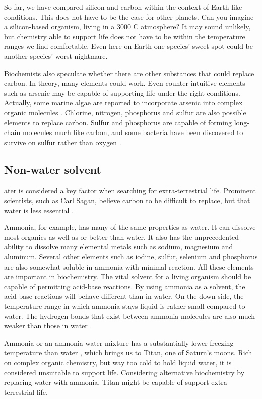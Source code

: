 So far, we have compared silicon and carbon within the context of Earth-like conditions.
This does not have to be the case for other planets.
Can you imagine a silicon-based organism, living in a 3000 \degree C atmosphere?
It may sound unlikely, but chemistry able to support life does not have to be within the temperature ranges we find comfortable.
Even here on Earth one species' sweet spot could be another species' worst nightmare.

Biochemists also speculate whether there are other substances that could replace carbon.
In theory, many elements could work.
Even counter-intuitive elements such as arsenic may be capable of supporting life under the right conditions.
Actually, some marine algae are reported to incorporate arsenic into complex organic molecules \cite{OForm3}.
Chlorine, nitrogen, phosphorus and sulfur are also possible elements to replace carbon.
Sulfur and phosphorus are capable of forming long-chain molecules much like carbon, and some bacteria have been discovered to survive on sulfur rather than oxygen \cite{OForm3}.

\subsection{Non-water solvent}

ater is considered a key factor when searching for extra-terrestrial life.
Prominent scientists, such as Carl Sagan, believe carbon to be difficult to replace, but that water is less essential \cite{OForm2} \cite{OForm3}.

Ammonia, for example, has many of the same properties as water.
It can dissolve most organics as well as or better than water.
It also has the unprecedented ability to dissolve many elemental metals such as sodium, magnesium and aluminum.
Several other elements such as iodine, sulfur, selenium and phosphorus are also somewhat soluble in ammonia with minimal reaction.
All these elements are important in biochemistry.
The vital solvent for a living organism should be capable of permitting acid-base reactions.
By using ammonia as a solvent, the acid-base reactions will behave different than in water.
On the down side, the temperature range in which ammonia stays liquid is rather small compared to water.
The hydrogen bonds that exist between ammonia molecules are also much weaker than those in water \cite{OForm7}.

Ammonia or an ammonia-water mixture has a substantially lower freezing temperature than water \cite{OForm3}, which brings us to Titan, one of Saturn's moons.
Rich on complex organic chemistry, but way too cold to hold liquid water, it is considered unsuitable to support life.
Considering alternative biochemistry by replacing water with ammonia, Titan might be capable of support extra-terrestrial life.

